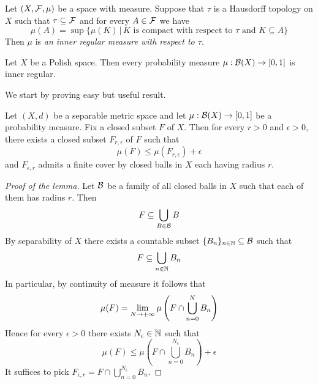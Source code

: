 \begin{definition}
Let $(X,{\mathcal F},\mu)$ be a space with measure. Suppose that $\tau$ is a Hausdorff topology on $X$ such that $\tau \subseteq {\mathcal F}$ and for every $A\in {\mathcal F}$ we have
$$\mu(A) = \sup \big\{\mu(K)\,\big|\,K\mbox{ is compact with respect to $\tau$ and }K\subseteq A\big\}$$
Then $\mu$ is \textit{an inner regular measure with respect to $\tau$}.
\end{definition}

\begin{theorem}[Ulam]\label{theorem:ulams_theorem_on_inner_regularity_of_measures_on_polish_spaces}
Let $X$ be a Polish space. Then every probability measure $\mu:{\mathcal B}(X)\rightarrow [0,1]$ is inner regular.
\end{theorem}
\noindent
We start by proving easy but useful result.

\begin{lemma}\label{lemma:finite_family_of_closed_balls_with_almost_full_measure_for_closed_subset}
Let $(X,d)$ be a separable metric space and let $\mu:{\mathcal B}(X)\rightarrow [0,1]$ be a probability measure. Fix a closed subset $F$ of $X$. Then for every $r > 0$ and $\epsilon > 0$, there exists a closed subset $F_{r,\epsilon}$ of $F$ such that
$$\mu(F) \leq \mu(F_{r,\epsilon}) + \epsilon$$
and $F_{\epsilon,r}$ admits a finite cover by closed balls in $X$ each having radius $r$.
\end{lemma}
\begin{proof}[Proof of the lemma]
Let ${\mathcal B}$ be a family of all closed balls in $X$ such that each of them has radius $r$. Then
$$F \subseteq \bigcup_{B\in {\mathcal B}}B$$
By separability of $X$ there exists a countable subset $\{B_n\}_{n\in {\mathbb N}} \subseteq {\mathcal B}$ such that
$$F \subseteq \bigcup_{n\in {\mathbb N}}B_n$$
In particular, by continuity of measure it follows that
$$\mu(F) = \lim_{N\rightarrow +\infty}\mu\left(F\cap \bigcup_{n=0}^NB_n\right)$$
Hence for every $\epsilon > 0$ there exists $N_{\epsilon} \in {\mathbb N}$ such that 
$$\mu(F) \leq \mu\left(F\cap \bigcup_{n=0}^{N_{\epsilon}}B_n\right) + \epsilon$$
It suffices to pick $F_{\epsilon,r} = F\cap \bigcup_{n=0}^{N_{\epsilon}}B_n$.
\end{proof}

